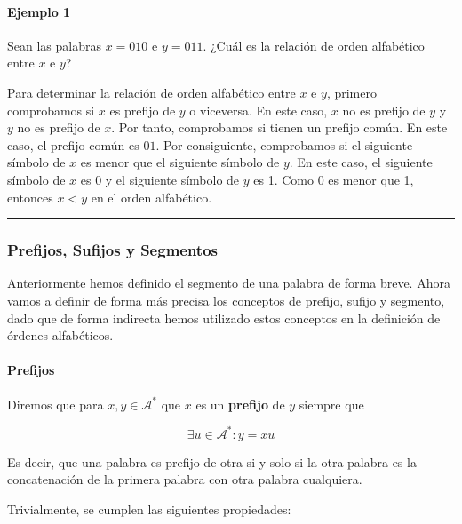 \paragraph{Ejemplo 1}\label{ejemplo-1-1-estructura-del-lenguaje}

Sean las palabras \(x=010\) e \(y=011\). ¿Cuál es la relación de orden
alfabético entre \(x\) e \(y\)?

Para determinar la relación de orden alfabético entre \(x\) e \(y\),
primero comprobamos si \(x\) es prefijo de \(y\) o viceversa. En este
caso, \(x\) no es prefijo de \(y\) y \(y\) no es prefijo de \(x\). Por
tanto, comprobamos si tienen un prefijo común. En este caso, el prefijo
común es \(01\). Por consiguiente, comprobamos si
el siguiente símbolo de \(x\) es menor que el siguiente símbolo de
\(y\). En este caso, el siguiente símbolo de \(x\) es 0 y el siguiente
símbolo de \(y\) es 1. Como 0 es menor que 1, entonces \(x < y\) en el
orden alfabético.

\begin{center}\rule{0.5\linewidth}{0.5pt}\end{center}

\subsubsection{Prefijos, Sufijos y
Segmentos}\label{prefijos-sufijos-y-segmentos}

Anteriormente hemos definido el segmento de una palabra de forma breve.
Ahora vamos a definir de forma más precisa los conceptos de prefijo,
sufijo y segmento, dado que de forma indirecta hemos utilizado estos
conceptos en la definición de órdenes alfabéticos.

\paragraph{Prefijos}\label{prefijos}

Diremos que para \(x,y\in\mathcal{A}^*\) que \(x\) es un
\textbf{prefijo} de \(y\) siempre que

\[
\exists u\in\mathcal{A}^*:y=xu
\]

Es decir, que una palabra es prefijo de otra si y solo si la otra
palabra es la concatenación de la primera palabra con otra palabra
cualquiera.

Trivialmente, se cumplen las siguientes propiedades:


